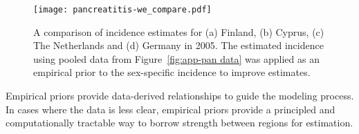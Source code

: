     \begin{figure}[h]
        \begin{center}
            \texttt{[image: pancreatitis-we\_compare.pdf]}
            \caption{A comparison of incidence estimates for (a) Finland, 
              (b) Cyprus, (c) The Netherlands and (d) Germany in 2005.  The estimated incidence
              using pooled data from Figure~\ref{fig:app-pan data} was applied
              as an empirical prior to the sex-specific incidence to
              improve estimates.}
            \label{fig:app-pan compare}
        \end{center}
    \end{figure}

Empirical priors provide data-derived relationships to guide the
modeling process.  In cases where the data is less clear, empirical
priors provide a principled and computationally tractable way to
borrow strength between regions for estimation.
